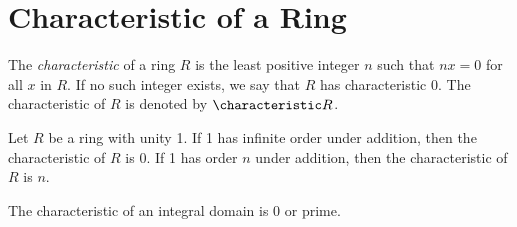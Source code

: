 \section{Characteristic of a Ring}

\begin{definition}
	The \textit{characteristic} of a ring $R$ is the least positive integer $n$ such that $nx = 0$ for all $x$ in $R$. If no such integer exists, we say that $R$ has characteristic 0. The characteristic of $R$ is denoted by $\characteristic R$.
\end{definition}

\begin{theorem}
	Let $R$ be a ring with unity 1. If 1 has infinite order under addition, then the characteristic of $R$ is 0. If 1 has order $n$ under addition, then the characteristic of $R$ is $n$.
\end{theorem}

\begin{theorem}
	The characteristic of an integral domain is 0 or prime.
\end{theorem}
